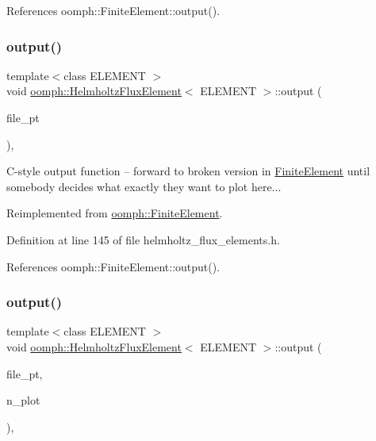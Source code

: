 References oomph\+::\+Finite\+Element\+::output().

\mbox{\label{classoomph_1_1HelmholtzFluxElement_a8afbad47be6598b8a4a6776aa21bb38a}} 
\subsubsection{\texorpdfstring{output()}{output()}\hspace{0.1cm}{\footnotesize\ttfamily [3/4]}}
{\footnotesize\ttfamily template$<$class E\+L\+E\+M\+E\+NT $>$ \\
void \hyperlink{classoomph_1_1HelmholtzFluxElement}{oomph\+::\+Helmholtz\+Flux\+Element}$<$ E\+L\+E\+M\+E\+NT $>$\+::output (\begin{DoxyParamCaption}\item[{F\+I\+LE $\ast$}]{file\+\_\+pt }\end{DoxyParamCaption})\hspace{0.3cm}{\ttfamily [inline]}, {\ttfamily [virtual]}}

C-\/style output function -- forward to broken version in \hyperlink{classoomph_1_1FiniteElement}{Finite\+Element} until somebody decides what exactly they want to plot here... 

Reimplemented from \hyperlink{classoomph_1_1FiniteElement_a72cddd09f8ddbee1a20a1ff404c6943e}{oomph\+::\+Finite\+Element}.



Definition at line 145 of file helmholtz\+\_\+flux\+\_\+elements.\+h.



References oomph\+::\+Finite\+Element\+::output().

\mbox{\label{classoomph_1_1HelmholtzFluxElement_a125673c600acb76787db63810c51066d}} 
\subsubsection{\texorpdfstring{output()}{output()}\hspace{0.1cm}{\footnotesize\ttfamily [4/4]}}
{\footnotesize\ttfamily template$<$class E\+L\+E\+M\+E\+NT $>$ \\
void \hyperlink{classoomph_1_1HelmholtzFluxElement}{oomph\+::\+Helmholtz\+Flux\+Element}$<$ E\+L\+E\+M\+E\+NT $>$\+::output (\begin{DoxyParamCaption}\item[{F\+I\+LE $\ast$}]{file\+\_\+pt,  }\item[{const unsigned \&}]{n\+\_\+plot }\end{DoxyParamCaption})\hspace{0.3cm}{\ttfamily [inline]}, {\ttfamily [virtual]}}



